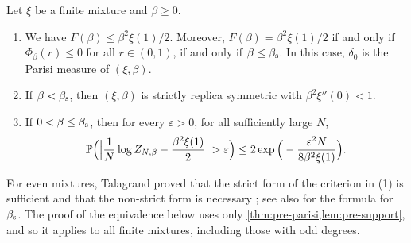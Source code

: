 \begin{lemma}\label{lem:pre-RS}
Let $\xi$ be a finite mixture and $\beta\ge0$.
\begin{enumerate}
\item We have $F(\beta)\le\beta^2\xi(1)/2$. Moreover, $F(\beta)=\beta^2\xi(1)/2$ if and only if $\Phi_\beta(r)\le0$ for all $r\in(0,1)$, if and only if $\beta\le\beta_{\mathrm s}$. In this case, $\delta_0$ is the Parisi measure of $(\xi,\beta)$.
\item If $\beta<\beta_{\mathrm s}$, then $(\xi,\beta)$ is strictly replica symmetric with $\beta^2\xi''(0)<1$.
\item If $0<\beta\le\beta_{\mathrm s}$, then for every $\varepsilon>0$, for all sufficiently large $N$,
\begin{equation}\label{eq:pre-RS-concentration}
\Pp\Big(\Big|\frac1N\log Z_{N,\beta}-\frac{\beta^2\xi(1)}2\Big|>\varepsilon\Big)\le2\exp\Big(-\frac{\varepsilon^2N}{8\beta^2\xi(1)}\Big).
\end{equation}
\end{enumerate}
\end{lemma}

For even mixtures, Talagrand proved that the strict form of the criterion in (1) is sufficient and that the non-strict form is necessary \cite[Proposition~2.3]{Talagrand2006}; see also \cite[(5.2)]{AuffingerElAlaouiSellke2025} for the formula for $\beta_{\mathrm s}$. The proof of the equivalence below uses only \cref{thm:pre-parisi,lem:pre-support}, and so it applies to all finite mixtures, including those with odd degrees.


